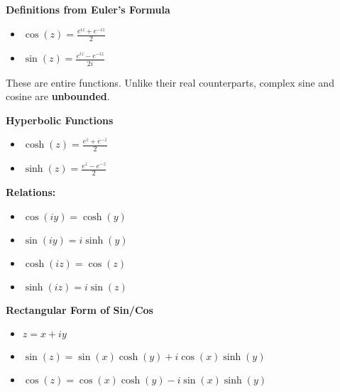 \documentclass{../cheatsheet}
\begin{document}
\begin{multicols}{3}
\textbf{Definitions from Euler's Formula}
\begin{itemize}
    \item $\cos(z) = \frac{e^{iz} + e^{-iz}}{2}$
    \item $\sin(z) = \frac{e^{iz} - e^{-iz}}{2i}$
\end{itemize}
These are entire functions. Unlike their real counterparts, complex sine and cosine are \textbf{unbounded}.

\textbf{Hyperbolic Functions}
\begin{itemize}
    \item $\cosh(z) = \frac{e^{z} + e^{-z}}{2}$
    \item $\sinh(z) = \frac{e^{z} - e^{-z}}{2}$
\end{itemize}
\textbf{Relations:}
\begin{itemize}
    \item $\cos(iy) = \cosh(y)$
    \item $\sin(iy) = i\sinh(y)$
    \item $\cosh(iz) = \cos(z)$
    \item $\sinh(iz) = i\sin(z)$
\end{itemize}

\textbf{Rectangular Form of Sin/Cos}
\begin{itemize}
    \item $z=x+iy$
    \item $\sin(z) = \sin(x)\cosh(y) + i\cos(x)\sinh(y)$
    \item $\cos(z) = \cos(x)\cosh(y) - i\sin(x)\sinh(y)$
\end{itemize}






\end{multicols}
\end{document}
